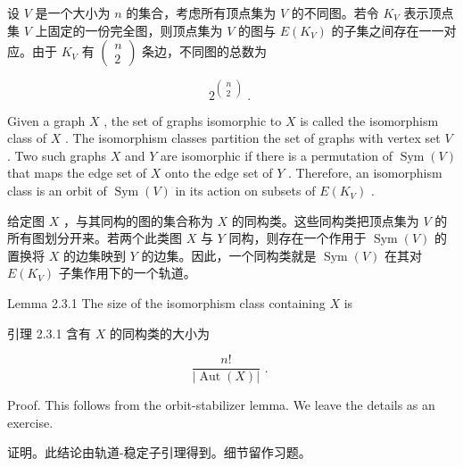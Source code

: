 \documentclass[10pt]{article}
\begin{document}
\begin{tcolorbox}\relax
设 \(V\) 是一个大小为 \(n\) 的集合，考虑所有顶点集为 \(V\) 的不同图。若令 \({K}_{V}\) 表示顶点集 \(V\) 上固定的一份完全图，则顶点集为 \(V\) 的图与 \(E\left( {K}_{V}\right)\) 的子集之间存在一一对应。由于 \({K}_{V}\) 有 \(\left( \begin{array}{l} n \\  2 \end{array}\right)\) 条边，不同图的总数为
\end{tcolorbox}

\[
{2}^{\left( \begin{matrix} n \\  2 \end{matrix}\right) }\text{ . }
\]

Given a graph \(X\) , the set of graphs isomorphic to \(X\) is called the isomorphism class of \(X\) . The isomorphism classes partition the set of graphs with vertex set \(V\) . Two such graphs \(X\) and \(Y\) are isomorphic if there is a permutation of \(\operatorname{Sym}\left( V\right)\) that maps the edge set of \(X\) onto the edge set of \(Y\) . Therefore, an isomorphism class is an orbit of \(\operatorname{Sym}\left( V\right)\) in its action on subsets of \(E\left( {K}_{V}\right)\) .

\begin{tcolorbox}\relax
给定图 \(X\) ，与其同构的图的集合称为 \(X\) 的同构类。这些同构类把顶点集为 \(V\) 的所有图划分开来。若两个此类图 \(X\) 与 \(Y\) 同构，则存在一个作用于 \(\operatorname{Sym}\left( V\right)\) 的置换将 \(X\) 的边集映到 \(Y\) 的边集。因此，一个同构类就是 \(\operatorname{Sym}\left( V\right)\) 在其对 \(E\left( {K}_{V}\right)\) 子集作用下的一个轨道。
\end{tcolorbox}

Lemma 2.3.1 The size of the isomorphism class containing \(X\) is

\begin{tcolorbox}\relax
引理 2.3.1 含有 \(X\) 的同构类的大小为
\end{tcolorbox}

\[
\frac{n!}{\left| \operatorname{Aut}\left( X\right) \right| }\text{ . }
\]

Proof. This follows from the orbit-stabilizer lemma. We leave the details as an exercise.

\begin{tcolorbox}\relax
证明。此结论由轨道-稳定子引理得到。细节留作习题。
\end{tcolorbox}
\end{document}
